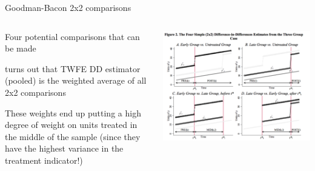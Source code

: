 \documentclass[notes,11pt, aspectratio=169]{beamer}
\newenvironment{wideitemize}{\itemize\addtolength{\itemsep}{10pt}}{\enditemize}
\begin{document}
\begin{frame}{Goodman-Bacon 2x2 comparisons}
  \begin{columns}[T] %
    \begin{column}{0.4\textwidth}
      \begin{wideitemize}
      \item Four potential comparisons that can be made
      \item turns out that TWFE DD estimator (pooled) is the 
        weighted average of all 2x2 comparisons
      \item These weights end up putting a high degree of weight on
        units treated in the middle of the sample (since they have the
        highest variance in the treatment indicator!)
      \end{wideitemize}
    \end{column}%
    \hfill%
    \begin{column}{.6\textwidth}
      \includegraphics[width=\linewidth]{images/bacon_2.pdf}
    \end{column}%
  \end{columns}
\end{frame}
\end{document}
